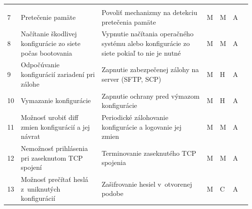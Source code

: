 \begin{longtable}[!htbp]{|C{2.5em}L{11em}L{11em}C{2.5em}C{4em}C{5em}L{2.5em}|}
	\cite{CIS_DrTLsgXv24lxeIIM}\\
	 7	&Pretečenie pamäte	&Povoliť mechanizmy na detekciu pretečenia pamäte	&M	&M	&A	& \cite{Singh2018}\\
	8	&Načítanie škodlivej konfigurácie zo siete počas bootovania	&Vypnutie načítania operačného systému alebo konfigurácie zo siete pokiaľ to nie je nutné	&M	&M	&A	& \cite{Akin2002}\\
	 9	&Odpočúvanie konfigurácií zariadení pri zálohe	&Zapnutie zabezpečenej zálohy na server (SFTP, SCP)	&M	&H	&A	& \cite{Singh2018}\\
	10	&Vymazanie konfigurácie	&Zapnutie ochrany pred výmazom konfigurácie	&M	&H	&A	& \cite{McMillan2018}\\
	 11	&Možnosť urobiť diff zmien konfigurácií a jej návrat	&Periodické zálohovanie konfigurácie a logovanie jej zmien	&M	&M	&A	& \cite{McMillan2018}
	
	\cite{Singh2018}\\
	12	&Nemožnosť prihlásenia pri zaseknutom TCP spojení	&Terminovanie zaseknutého TCP spojenia	&M	&M	&A	& \cite{Singh2018}\\
	 13	&Možnosť prečítať heslá z~uniknutých konfigurácií	&Zašifrovanie hesiel v~otvorenej podobe	&M	&C	&A	& \cite{CIS_DrTLsgXv24lxeIIM}\\
	
	\hline
\end{longtable}%









\restoregeometry 
\normalsize

